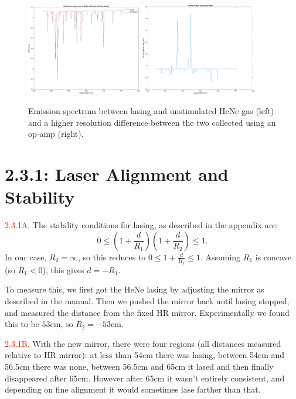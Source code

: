 \documentclass[letterpaper, reqno,11pt]{article}
\begin{document}
\begin{figure}[htpb]
    \centering
    \includegraphics[width=0.45\textwidth]{4A}
    \includegraphics[width=0.45\textwidth]{4F}
    \caption{Emission spectrum between lasing and unstimulated HeNe gas (left) and a higher resolution difference between the two collected using an op-amp (right).}
    \label{fig:rn}
\end{figure}

\newpage

\section{2.3.1: Laser Alignment and Stability}

\noindent \textcolor{red}{2.3.1A.} The stability conditions for lasing, as described in the appendix are:
\[
0\leq \left(1+ \frac{d}{R_1}\right) \left( 1+ \frac{d}{R_2} \right) \leq 1
.\]
In our case, $R_2=\infty$, so this reduces to $0\leq 1+ \frac{d}{R_1}\leq 1$. Assuming $R_1$ is concave (so $R_1< 0$), this gives $d=-R_1$.

To measure this, we first got the HeNe lasing by adjusting the mirror as described in the manual. Then we pushed the mirror back until lasing stopped, and measured the distance from the fixed HR mirror. Experimentally we found this to be $53$cm, so $R_2=-53$cm.

\medskip

\noindent \textcolor{red}{2.3.1B.} With the new mirror, there were four regions (all distances measured relative to HR mirror): at less than 54cm there was lasing, between 54cm and 56.5cm there was none, between 56.5cm and 65cm it lased and then finally disappeared after 65cm. However after 65cm it wasn't entirely consistent, and depending on fine alignment it would sometimes lase farther than that.
\end{document}
